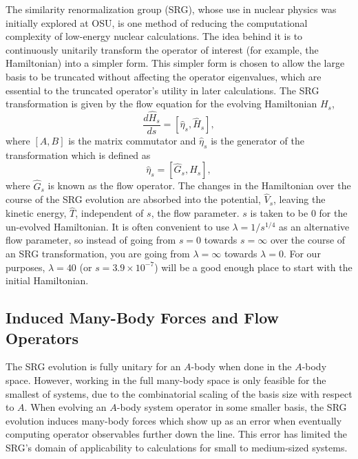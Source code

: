 The similarity renormalization group (SRG), whose use in nuclear physics was initially explored at OSU, is one method of reducing the computational complexity of low-energy nuclear calculations. The idea behind it is to continuously unitarily transform the operator of interest (for example, the Hamiltonian) into a simpler form. This simpler form is chosen to allow the large basis to be truncated without affecting the operator eigenvalues, which are essential to the truncated operator's utility in later calculations. The SRG transformation is given by the flow equation for the evolving Hamiltonian $H_s$,
\begin{equation}
\frac{d \hat{H}_s}{ds} = [\hat{\eta}_s, \hat{H}_s],
\end{equation}
where $[A, B]$ is the matrix commutator and $\hat{\eta}_s$ is the generator of the transformation which is defined as
\begin{equation}
\hat{\eta}_s = [\hat{G}_s, \hat{H}_s],
\end{equation}
where $\hat{G}_s$ is known as the flow operator. The changes in the Hamiltonian over the course of the SRG evolution are absorbed into the potential, $\hat{V}_s$, leaving the kinetic energy, $\hat{T}$, independent of $s$, the flow parameter. $s$ is taken to be 0 for the un-evolved Hamiltonian. It is often convenient to use $\lambda = 1 / s^{1/4}$ as an alternative flow parameter, so instead of going from $s=0$ towards $s=\infty$ over the course of an SRG transformation, you are going from $\lambda=\infty$ towards $\lambda=0$. For our purposes, $\lambda=40$ (or $s=3.9 \times 10^{-7}$) will be a good enough place to start with the initial Hamiltonian.

\subsection{Induced Many-Body Forces and Flow Operators}

The SRG evolution is fully unitary for an $A$-body when done in the $A$-body space. However, working in the full many-body space is only feasible for the smallest of systems, due to the combinatorial scaling of the basis size with respect to $A$. When evolving an $A$-body system operator in some smaller basis, the SRG evolution induces many-body forces which show up as an error when eventually computing operator observables further down the line. This error has limited the SRG's domain of applicability to calculations for small to medium-sized systems.

